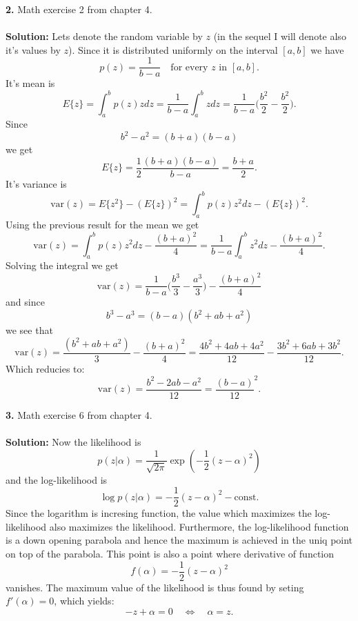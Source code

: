 \documentclass[10pt,a4paper]{amsart}
\newenvironment{tehtratk}%
             {\begin{list}{\arabic{enumi}.}{\usecounter{enumi}%
              \setlength{\labelsep}{0.5em}%
              \settowidth{\labelwidth}{\arabic{enumi}.}%
              \setlength{\leftmargin}{\labelwidth+\labelsep}}}%
             {\end{list}}
\begin{document}
\begin{tehtratk}
\item[\textbf{2.}] Math exercise 2 from chapter 4.\\
\\
\textbf{Solution:} Lets denote the random variable by $z$ (in the sequel I will
denote also it's values by $z$). Since it is distributed uniformly on the
interval $[a, b]$ we have
\[
p(z) = \frac{1}{b - a} \quad \text{for every $z$ in $[a, b]$}.
\]
It's mean is
\[
E\{z\} = \int_a^b p(z)zdz = \frac{1}{b - a}\int_a^b zdz =
\frac{1}{b - a}\Big(\frac{b^2}{2} - \frac{b^2}{2}\Big).
\]
Since
\[
b^2 - a^2 = (b + a)(b - a)
\]
we get
\[
E\{z\} =
\frac{1}{2}\frac{(b + a)(b - a)}{b - a} = \frac{b + a}{2}.
\]
It's variance is
\[
\text{var}(z) = E\{z^2\} - (E\{z\})^2 = \int_a^b p(z)z^2dz  - (E\{z\})^2.
\]
Using the previous result for the mean we get
\[
\text{var}(z) = \int_a^b p(z)z^2dz  - \frac{(b + a)^2}{4} =
\frac{1}{b - a}\int_a^b z^2dz - \frac{(b + a)^2}{4}.
\]
Solving the integral we get
\[
\text{var}(z) =
\frac{1}{b - a}\Big(\frac{b^3}{3} - \frac{a^3}{3}\Big)- \frac{(b + a)^2}{4}
\]
and since
\[
b^3 - a^3 = (b -a)(b^2 + ab + a^2)
\]
we see that
\[
\text{var}(z) = \frac{(b^2 + ab + a^2)}{3} - \frac{(b + a)^2}{4}
= \frac{4b^2 + 4ab + 4a^2}{12} -\frac{3b^2 + 6ab + 3b^2}{12}.\]
Which reducies to:
\[
\text{var}(z) = \frac{b^2 - 2ab - a^2}{12} = \frac{(b - a)}{12}^2.
\]
\vspace{0.3cm}
\item[\textbf{3.}] Math exercise 6 from chapter 4.\\
\\
\textbf{Solution:} Now the likelihood is
\[
p(z|\alpha) = \frac{1}{\sqrt{2 \pi}}\exp(-\frac{1}{2}(z - \alpha)^2)
\]
and the log-likelihood is
\[
\log p(z|\alpha) = -\frac{1}{2}(z - \alpha)^2 - \text{const.}
\]
Since the logarithm is incresing function, the value which maximizes the
log-likelihood also maximizes the likelihood. Furthermore, the log-likelihood
function is a down opening parabola and hence the maximum is achieved in the
uniq point on top of the parabola. This point is also a point where derivative
of function
\[f(\alpha) = -\frac{1}{2}(z - \alpha)^2\]
vanishes.
The maximum value of the likelihood is thus found by seting $f'(\alpha) = 0$,
which yields:
\[
-z + \alpha = 0 \quad \Leftrightarrow \quad \alpha = z.
\]
\end{tehtratk}
\end{document}

